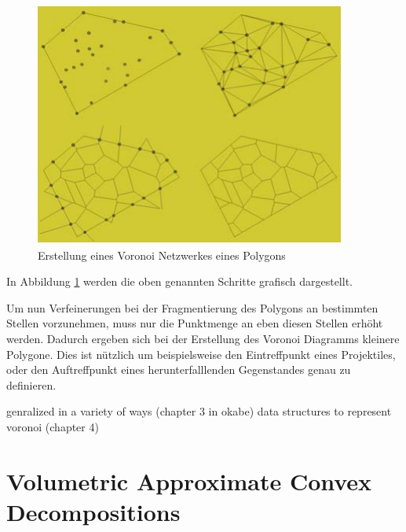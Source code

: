 \begin{figure}[H]
    \centering
    \includegraphics[width=0.5\linewidth]{PICs/voronoiSteps.PNG}
    \caption{Erstellung eines Voronoi Netzwerkes eines Polygons \protect\cite{Raghavachary.FractureGenerationOnPolygonalMeshes}}
    \label{fig:voronoi2}
\end{figure}

In Abbildung \ref{fig:voronoi2} werden die oben genannten Schritte grafisch dargestellt.

Um nun Verfeinerungen bei der Fragmentierung des Polygons an bestimmten Stellen vorzunehmen, muss nur die Punktmenge an eben diesen Stellen erhöht werden. Dadurch ergeben
sich bei der Erstellung des Voronoi Diagramms kleinere Polygone. Dies ist nützlich um beispielsweise den Eintreffpunkt eines Projektiles, oder 
den Auftreffpunkt eines herunterfalllenden Gegenstandes genau zu definieren. 




genralized in a variety of ways (chapter 3 in okabe)
data structures to represent voronoi (chapter 4)


\section{Volumetric Approximate Convex Decompositions}

